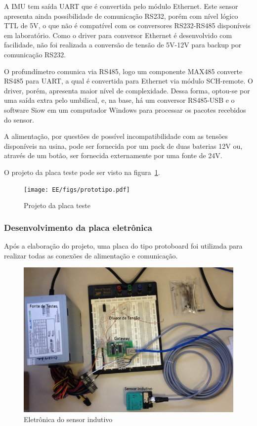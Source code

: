 A IMU tem saída UART que é convertida pelo módulo Ethernet. Este sensor
apresenta ainda possibilidade de comunicação RS232, porém com nível lógico TTL
de 5V, o que não é compatível com os conversores RS232-RS485 disponíveis em
laboratório. Como o driver para conversor Ethernet é desenvolvido com
facilidade, não foi realizada a conversão de tensão de 5V-12V para
backup por comunicação RS232.

O profundímetro comunica via RS485, logo um componente MAX485 converte RS485
para UART, a qual é convertida para Ethernet via módulo SCH-remote. O driver,
porém, apresenta maior nível de complexidade. Dessa forma, optou-se por uma
saída extra pelo umbilical, e, na base, há um conversor RS485-USB e o
software Siow em um computador Windows para processar os pacotes recebidos do
sensor.

A alimentação, por questões de possível incompatibilidade com as tensões
disponíveis na usina, pode ser fornecida por um pack de duas baterias 12V ou,
através de um botão, ser fornecida externamente por uma fonte de 24V.

O projeto da placa teste pode ser visto na figura~\ref{fig:prototipo}.

\begin{figure}[H]
 \centering
 \texttt{[image: EE/figs/prototipo.pdf]}
 \caption{Projeto da placa teste}
 \label{fig:prototipo}
 \end{figure}

\subsubsection{Desenvolvimento da placa eletrônica}
Após a elaboração do projeto, uma placa do tipo protoboard foi utilizada para
realizar todas as conexões de alimentação e comunicação.

\begin{figure}[h!]
 \centering
 \includegraphics[width=1\columnwidth]{indutivo/figs/indutivo_bancada.png}
 \caption{Eletrônica do sensor indutivo}
 \label{fig:indu_banc}
 \end{figure}


 

\label{metodos}


